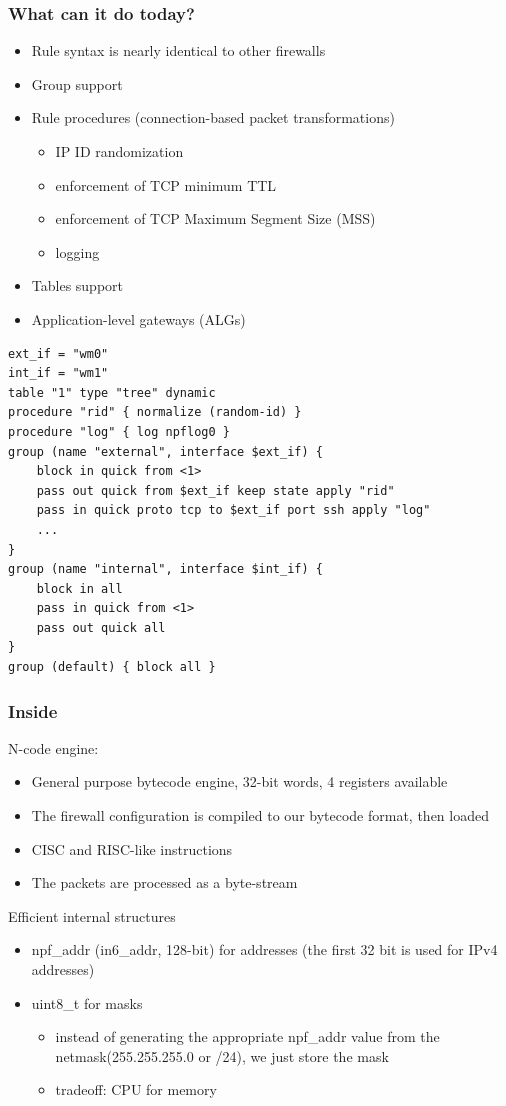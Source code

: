 \documentclass[magyar]{beamer}
\begin{document}
\begin{frame}
\frametitle{What can it do today?}
\begin{itemize}
	\item Rule syntax is nearly identical to other firewalls
	\item Group support
	\item Rule procedures (connection-based packet transformations)
	\begin{itemize}
		\item IP ID randomization
		\item enforcement of TCP minimum TTL
		\item enforcement of TCP Maximum Segment Size (MSS)
		\item logging
	\end{itemize}
	\item Tables support
	\item Application-level gateways (ALGs)
\end{itemize}
\end{frame}

\begin{frame}[fragile,basicstyle=\ttfamily]
\begin{verbatim}
ext_if = "wm0"
int_if = "wm1"
table "1" type "tree" dynamic
procedure "rid" { normalize (random-id) }
procedure "log" { log npflog0 }
group (name "external", interface $ext_if) {
    block in quick from <1>
    pass out quick from $ext_if keep state apply "rid"
    pass in quick proto tcp to $ext_if port ssh apply "log"
    ...
}
group (name "internal", interface $int_if) {
    block in all
    pass in quick from <1>
    pass out quick all
}
group (default) { block all }
\end{verbatim}
\end{frame}

\begin{frame}
\frametitle{Inside}
N-code engine:
\begin{itemize}
	\item General purpose bytecode engine, 32-bit words, 4 registers available
	\item The firewall configuration is compiled to our bytecode format, then loaded
	\item CISC and RISC-like instructions
	\item The packets are processed as a byte-stream
\end{itemize}
Efficient internal structures
\begin{itemize}
	\item npf\_addr (in6\_addr, 128-bit) for addresses (the first 32 bit is used for IPv4 addresses)
	\item uint8\_t for masks
	\begin{itemize}
		\item instead of generating the appropriate npf\_addr value from the netmask(255.255.255.0 or /24), we just store
the mask
		\item tradeoff: CPU for memory
	\end{itemize}
\end{itemize}
\end{frame}
\end{document}
